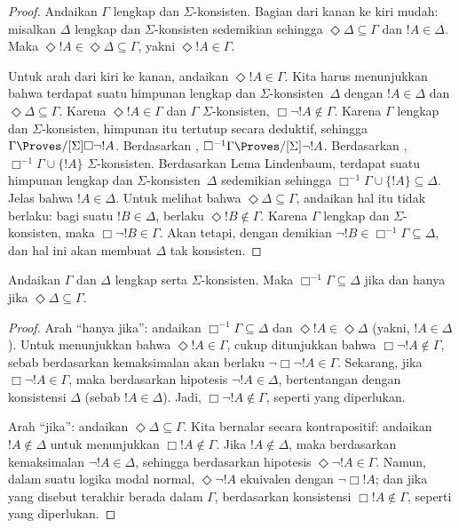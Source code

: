 \documentclass[../../../include/open-logic-section]{subfiles}
\begin{document}
{\begin{proof}
  Andaikan $\Gamma$ lengkap dan $\Sigma$-konsisten. Bagian dari kanan ke kiri
  mudah: misalkan $\Delta$ lengkap dan $\Sigma$-konsisten sedemikian sehingga
  $\Diamond\Delta \subseteq \Gamma$ dan $!A \in \Delta$. Maka
  $\Diamond!A \in \Diamond\Delta \subseteq \Gamma$, yakni $\Diamond!A
  \in \Gamma$.

  Untuk arah dari kiri ke kanan, andaikan $\Diamond !A \in \Gamma$. Kita
  harus menunjukkan bahwa terdapat suatu himpunan lengkap dan
  $\Sigma$-konsisten~$\Delta$ dengan $!A \in \Delta$ dan
  $\Diamond\Delta \subseteq \Gamma$. Karena $\Diamond !A \in \Gamma$ dan
  $\Gamma$ $\Sigma$-konsisten, $\Box\lnot !A \notin \Gamma$. Karena
  $\Gamma$ lengkap dan $\Sigma$-konsisten, himpunan itu tertutup secara
  deduktif, sehingga $\Gamma \Proves/[\Sigma] \Box\lnot !A$. Berdasarkan
  , $\Box^{-1}\Gamma \Proves/[\Sigma] \lnot !A$.
  Berdasarkan
  ,
  $\Box^{-1}\Gamma \cup \{ !A \}$ $\Sigma$-konsisten. Berdasarkan Lema
  Lindenbaum, terdapat suatu himpunan lengkap dan
  $\Sigma$-konsisten~$\Delta$ sedemikian sehingga
  $\Box^{-1}\Gamma \cup \{ !A \} \subseteq
  \Delta$. Jelas bahwa $!A \in \Delta$. Untuk melihat bahwa
  $\Diamond\Delta \subseteq \Gamma$, andaikan hal itu tidak berlaku: bagi
  suatu $!B \in \Delta$, berlaku $\Diamond !B \notin \Gamma$. Karena
  $\Gamma$ lengkap dan $\Sigma$-konsisten, maka $\Box\lnot !B \in \Gamma$.
  Akan tetapi, dengan demikian $\lnot !B \in \Box^{-1}\Gamma \subseteq
  \Delta$, dan hal ini akan membuat $\Delta$ tak konsisten.
\end{proof}
}

\begin{lem}
  Andaikan $\Gamma$ dan $\Delta$ lengkap serta $\Sigma$-konsisten. Maka
  $\Box^{-1}\Gamma \subseteq \Delta$ jika dan hanya jika
  $\Diamond\Delta \subseteq \Gamma$.
\end{lem}

\begin{proof}
  Arah ``hanya jika'': andaikan $\Box^{-1}\Gamma \subseteq \Delta$ dan
  $\Diamond!A \in \Diamond\Delta$ (yakni, $!A \in \Delta$). Untuk
  menunjukkan bahwa $\Diamond!A \in \Gamma$, cukup ditunjukkan bahwa
  $\Box\lnot!A \notin \Gamma$, sebab berdasarkan kemaksimalan akan berlaku
  $\lnot\Box\lnot !A \in \Gamma$. Sekarang, jika $\Box\lnot!A \in \Gamma$,
  maka berdasarkan hipotesis $\lnot!A \in \Delta$, bertentangan dengan
  konsistensi $\Delta$ (sebab $!A \in \Delta$). Jadi,
  $\Box\lnot!A \notin \Gamma$, seperti yang diperlukan.

  Arah ``jika'': andaikan $\Diamond\Delta
  \subseteq \Gamma$. Kita bernalar secara kontrapositif: andaikan $!A
  \notin \Delta$ untuk menunjukkan $\Box!A \notin \Gamma$. Jika
  $!A \notin \Delta$, maka berdasarkan kemaksimalan $\lnot!A \in \Delta$,
  sehingga berdasarkan hipotesis $\Diamond\lnot!A \in \Gamma$. Namun, dalam
  suatu logika modal normal, $\Diamond\lnot!A$ ekuivalen dengan
  $\lnot\Box !A$; dan jika yang disebut terakhir berada dalam $\Gamma$,
  berdasarkan konsistensi $\Box!A \notin\Gamma$, seperti yang diperlukan.
\end{proof}
\end{document}
